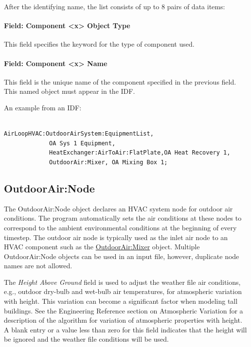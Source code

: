 After the identifying name, the list consists of up to 8 pairs of data items:

\paragraph{Field: Component \textless{}x\textgreater{} Object Type}\label{field-component-x-object-type}

This field specifies the keyword for the type of component used.

\paragraph{Field: Component \textless{}x\textgreater{} Name}\label{field-component-x-name}

This field is the unique name of the component specified in the previous field. This named object must appear in the IDF.

An example from an IDF:

\begin{lstlisting}

AirLoopHVAC:OutdoorAirSystem:EquipmentList,
             OA Sys 1 Equipment,
             HeatExchanger:AirToAir:FlatPlate,OA Heat Recovery 1,
             OutdoorAir:Mixer, OA Mixing Box 1;
\end{lstlisting}

\subsection{OutdoorAir:Node}\label{outdoorairnode}

The OutdoorAir:Node object declares an HVAC system node for outdoor air conditions. The program automatically sets the air conditions at these nodes to correspond to the ambient environmental conditions at the beginning of every timestep. The outdoor air node is typically used as the inlet air node to an HVAC component such as the \hyperref[outdoorairmixer]{OutdoorAir:Mixer} object. Multiple OutdoorAir:Node objects can be used in an input file, however, duplicate node names are not allowed.

The \emph{Height Above Ground} field is used to adjust the weather file air conditions, e.g., outdoor dry-bulb and wet-bulb air temperatures, for atmospheric variation with height. This variation can become a significant factor when modeling tall buildings. See the Engineering Reference section on Atmospheric Variation for a description of the algorithm for variation of atmospheric properties with height. A blank entry or a value less than zero for this field indicates that the height will be ignored and the weather file conditions will be used.

